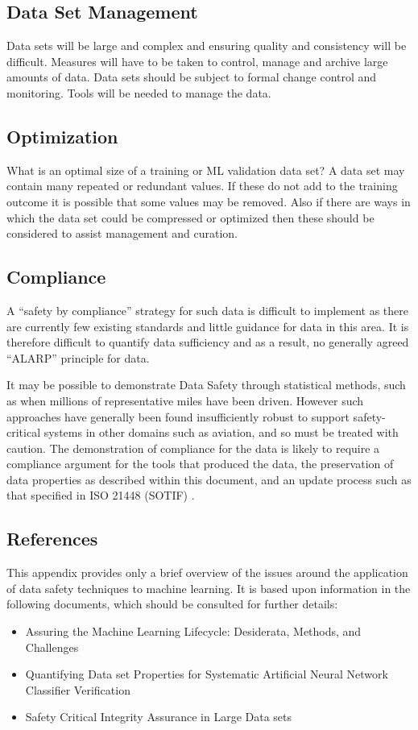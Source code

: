 \subsection{Data Set Management}
Data sets will be large and complex and ensuring quality and consistency will be difficult. Measures will have to be taken to control, manage and archive large amounts of data. Data sets should be subject to formal change control and monitoring. Tools will be needed to manage the data.

\subsection{Optimization}
What is an optimal size of a training or
ML
validation data set? A data set may contain many repeated or redundant values. If these do not add to the training outcome it is possible that some values may be removed. Also if there are ways in which the data set could be compressed or optimized then these should be considered to assist management and curation.

\subsection{Compliance}
A ``safety by compliance'' strategy for such data is difficult to implement as there are currently
few existing standards and little guidance for data in this area.
It is therefore difficult to quantify data sufficiency and as a result, no generally agreed ``ALARP'' principle for data.

It may be possible to demonstrate Data Safety through statistical methods,
such as when millions of representative miles have been driven.
However such approaches have generally been found insufficiently robust to support safety-critical systems in other domains
such as aviation, and so must be treated with caution.
The demonstration of compliance for the data is likely to require a compliance argument for the tools that produced the data,
the preservation of data properties as described within this document, and an update process such as that specified in ISO 21448 (SOTIF)
\cite{citation:ISO21448}.

\subsection{References}
This appendix provides only a brief overview of the issues around the application of data safety techniques to machine learning. It is based upon information in the following documents, which should be consulted for further details:
\begin{itemize}
\item Assuring the Machine Learning Lifecycle: Desiderata, Methods, and Challenges \cite{citation:Ashmore2019}
\item Quantifying Data set Properties for Systematic Artificial Neural Network Classifier Verification \cite{citation:Hond2020}
\item Safety Critical Integrity Assurance in Large Data sets \cite{citation:Sutherland2020}
\end{itemize}
